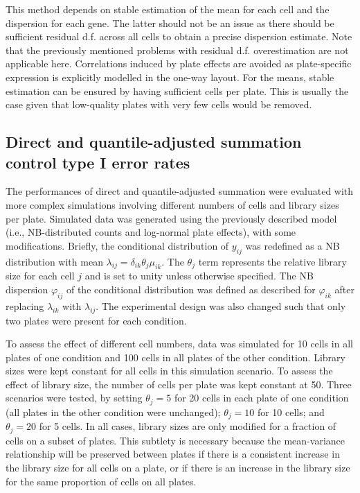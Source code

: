 \documentclass{article}
\begin{document}
This method depends on stable estimation of the mean for each cell and the dispersion for each gene.
The latter should not be an issue as there should be sufficient residual d.f. across all cells to obtain a precise dispersion estimate.
Note that the previously mentioned problems with residual d.f. overestimation are not applicable here.
Correlations induced by plate effects are avoided as plate-specific expression is explicitly modelled in the one-way layout.
For the means, stable estimation can be ensured by having sufficient cells per plate.
This is usually the case given that low-quality plates with very few cells would be removed.

\subsection{Direct and quantile-adjusted summation control type I error rates}
The performances of direct and quantile-adjusted summation were evaluated with more complex simulations involving different numbers of cells and library sizes per plate.
Simulated data was generated using the previously described model (i.e., NB-distributed counts and log-normal plate effects), with some modifications.
Briefly, the conditional distribution of $y_{ij}$ was redefined as a NB distribution with mean $\lambda_{ij} = \delta_{ik}\theta_{j}\mu_{ik}$.
The $\theta_{j}$ term represents the relative library size for each cell $j$ and is set to unity unless otherwise specified.
The NB dispersion $\varphi_{ij}$ of the conditional distribution was defined as described for $\varphi_{ik}$ after replacing $\lambda_{ik}$ with $\lambda_{ij}$.
The experimental design was also changed such that only two plates were present for each condition.

To assess the effect of different cell numbers, data was simulated for 10 cells in all plates of one condition and 100 cells in all plates of the other condition.
Library sizes were kept constant for all cells in this simulation scenario.
To assess the effect of library size, the number of cells per plate was kept constant at 50.
Three scenarios were tested, by setting $\theta_j=5$ for 20 cells in each plate of one condition (all plates in the other condition were unchanged);
    $\theta_j=10$ for 10 cells; and $\theta_j=20$ for 5 cells.
In all cases, library sizes are only modified for a fraction of cells on a subset of plates. 
This subtlety is necessary because the mean-variance relationship will be preserved between plates if there is a consistent increase in the library size for all cells on a plate, 
    or if there is an increase in the library size for the same proportion of cells on all plates.
\end{document}
